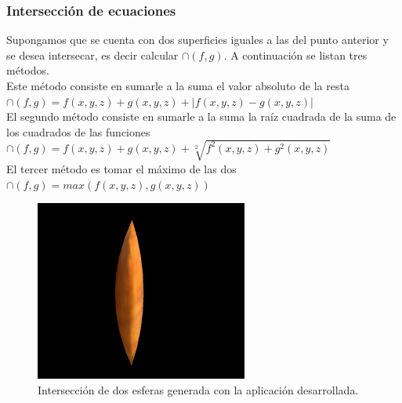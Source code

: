 \documentclass[12pt]{article}
\begin{document}
\subsubsection{Intersección de ecuaciones}
Supongamos que se cuenta con dos superficies iguales a las del punto anterior y se desea intersecar, es decir calcular $\cap(f,g)$. A continuación se listan tres métodos.
\\Este método consiste en sumarle a la suma el valor absoluto de la resta  $\cap(f,g)= f(x,y,z) + g(x,y,z)+ |f(x,y,z) - g(x,y,z)|$ 
\\El segundo método consiste en sumarle a la suma la raíz cuadrada de la suma de los cuadrados de las funciones   $\cap(f,g)= f(x,y,z) + g(x,y,z)+ \sqrt[2]{f^2(x,y,z) +g^2(x,y,z)}$ 
\\El tercer método es tomar el máximo de las dos   $\cap(f,g)= max(f(x,y,z) , g(x,y,z))$
\clearpage
\begin{figure}[h]
\includegraphics[width=\linewidth,center]{oi2.png}
\caption{Intersección de dos esferas generada con la aplicación desarrollada.}
\end{figure}
\end{document}
